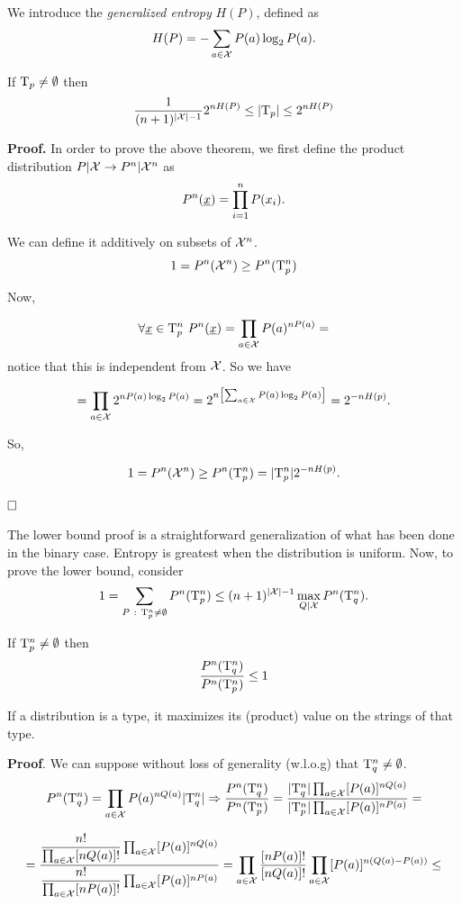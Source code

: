 We introduce the \emph{generalized entropy} $H(P)$, defined as $$H(P) = -\sum_{a \in \mathcal{X}} P(a)\log_2P(a).$$

\begin{thm} \label{thms:taupcard}
	If $\mathrm{T}_p \not= \emptyset$ then $$\dfrac{1}{(n+1)^{|\mathcal{X}| -1}}2^{nH(P)}\leq |\mathrm{T}_p| \leq 2^{nH(P)}$$
\end{thm}

\noindent\textbf{Proof.} In order to prove the above theorem, we first define the product distribution $P|\mathcal{X} \rightarrow P^n|\mathcal{X}^n$ as 
\begin{equation}
	P^n(\underline{x}) = \prod_{i = 1}^nP(x_i).
\end{equation}

We can define it additively on subsets of $\mathcal{X}^n$.
\[
1 = P^n(\mathcal{X}^n) \geq P^n(\mathrm{T}_p^n)
\]

Now,

\[
\forall \str{x} \in \Tau_p^n\ P^n(\str{x}) = \prod_{a \in \xset}P(a)^{nP(a)} =
\]
notice that this is independent from $\mathcal{X}$. So we have

\[ 
= \prod_{a \in \mathcal{X}} 2^{nP(a)\log_2P(a)} = 2^{n\left[\sum_{a \in \mathcal{X}} P(a)\log_2P(a)\right]} = 2^{-nH(p)}.
\]

So,

\[1 = P^n(\mathcal{X}^n) \geq P^n(\mathrm{T}^n_p) = |\mathrm{T}_p^n|2^{-nH(p)}. \]

$\hfill\Box$

The lower bound proof is a straightforward generalization of what has been done in the binary case. Entropy is greatest when the distribution is uniform. Now, to prove the lower bound, consider
\[
1 = \sum_{P\ :\ \mathrm{T}_p^n \not= \emptyset}P^n(\mathrm{T}_p^n) \leq (n+1)^{|\mathcal{X}|-1} \max_{Q|\mathcal{X}}P^n(\mathrm{T}_q^n).
\]

\begin{obs}
If $\mathrm{T}^n_p \not= \emptyset$ then $$\dfrac{P^n(\mathrm{T}^n_q)}{P^n(\mathrm{T}^n_p)} \leq 1$$

If a distribution is a type, it maximizes its (product) value on the strings of that type. 
\end{obs}

\noindent\textbf{Proof}. We can suppose without loss of generality (w.l.o.g) that $\mathrm{T}^n_q \not= \emptyset$.
\[
P^n(\mathrm{T}_q^n) = \prod_{a \in \mathcal{X}} P(a)^{nQ(a)}|\mathrm{T}_q^n| \Rightarrow \dfrac{P^n(\mathrm{T}_q^n)}{P^n(\mathrm{T}_p^n)} = \dfrac{|\mathrm{T}_q^n|\prod_{a \in \mathcal{X}}[P(a)]^{nQ(a)}}{|\mathrm{T}_p^n|\prod_{a \in \mathcal{X}}[P(a)]^{nP(a)}} =
\]

\[
 = \dfrac{\dfrac{n!}{\prod_{a\in\mathcal{X}}[nQ(a)]!}\prod_{a\in\mathcal{X}}[P(a)]^{nQ(a)}}
 {\dfrac{n!}{\prod_{a\in\mathcal{X}}[nP(a)]!}\prod_{a\in\mathcal{X}}[P(a)]^{nP(a)}} = \prod_{a \in\mathcal{X}} \dfrac{[nP(a)]!}{[nQ(a)]!}\prod_{a\in\mathcal{X}}[P(a)]^{n(Q(a)-P(a))}\leq 
\]


